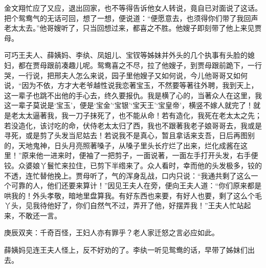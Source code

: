 \begin{parag}
    金文翔忙应了又应，退出回家，也不等得告诉他女人转说，竟自已对面说了这话。把个鸳鸯气的无话可回，想了一想，便说道：“便愿意去，也须得你们带了我回声老太太去。”他哥嫂听了，只当回想过来，都喜之不胜。他嫂子即刻带了他上来见贾母。
\end{parag}


\begin{parag}
    可巧王夫人、薛姨妈、李纨、凤姐儿、宝钗等姊妹并外头的几个执事有头脸的媳妇，都在贾母跟前凑趣儿呢。鸳鸯喜之不尽，拉了他嫂子，到贾母跟前跪下，一行哭，一行说，把邢夫人怎么来说，园子里他嫂子又如何说，今儿他哥哥又如何说，“因为不依，方才大老爷越性说我恋著宝玉，不然要等著往外聘，我到天上，这一辈子也跳不出他的手心去，终久要报仇。我是横了心的，当著众人在这里，我这一辈子莫说是‘宝玉’，便是‘宝金’‘宝银’‘宝天王’‘宝皇帝’，横竖不嫁人就完了！就是老太太逼著我，我一刀子抹死了，也不能从命！若有造化，我死在老太太之先；若没造化，该讨吃的命，伏侍老太太归了西，我也不跟著我老子娘哥哥去，我或是寻死，或是剪了头发当尼姑去！若说我不是真心，暂且拿话来支吾，日后再图别的，天地鬼神，日头月亮照著嗓子，从嗓子里头长疔烂了出来，烂化成酱在这里！”原来他一进来时，便袖了一把剪子，一面说著，一面左手打开头发，右手便铰。众婆娘丫鬟忙来拉住，已剪下半绺来了。众人看时，幸而他的头发极多，铰的不透，连忙替他挽上。贾母听了，气的浑身乱战，口内只说：“我通共剩了这么一个可靠的人，他们还要来算计！”因见王夫人在旁，便向王夫人道：“你们原来都是哄我的！外头孝敬，暗地里盘算我。有好东西也来要，有好人也要，剩了这么个毛丫头，见我待他好了，你们自然气不过，弄开了他，好摆弄我！”王夫人忙站起来，不敢还一言。\begin{note}庚辰双夹：千奇百怪，王妇人亦有罪乎？老人家迁怒之言必应如此。\end{note}薛姨妈见连王夫人怪上，反不好劝的了。李纨一听见鸳鸯的话，早带了姊妹们出去。
\end{parag}


